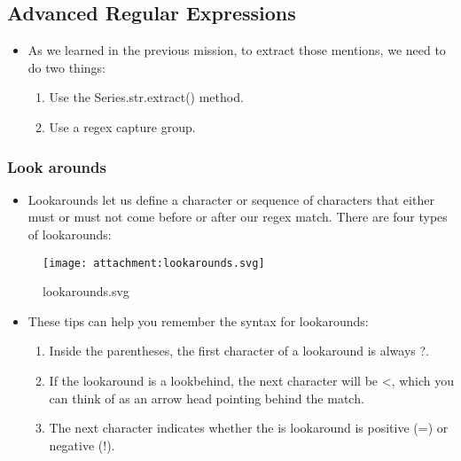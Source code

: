 \documentclass[11pt]{article}
\providecommand{\tightlist}{%
      \setlength{\itemsep}{0pt}\setlength{\parskip}{0pt}}
\begin{document}
    \hypertarget{advanced-regular-expressions}{%
\subsection{Advanced Regular
Expressions}\label{advanced-regular-expressions}}

    \begin{itemize}
\item
  As we learned in the previous mission, to extract those mentions, we
  need to do two things:

  \begin{enumerate}
  \def\labelenumi{\arabic{enumi}.}
  \tightlist
  \item
    Use the Series.str.extract() method.
  \item
    Use a regex capture group.
  \end{enumerate}
\end{itemize}

\hypertarget{look-arounds}{%
\subsubsection{Look arounds}\label{look-arounds}}

\begin{itemize}
\tightlist
\item
  Lookarounds let us define a character or sequence of characters that
  either must or must not come before or after our regex match. There
  are four types of lookarounds:
\end{itemize}

\begin{figure}
\centering
\texttt{[image: attachment:lookarounds.svg]}
\caption{lookarounds.svg}
\end{figure}

\begin{itemize}
\item
  These tips can help you remember the syntax for lookarounds:

  \begin{enumerate}
  \def\labelenumi{\arabic{enumi}.}
  \tightlist
  \item
    Inside the parentheses, the first character of a lookaround is
    always ?.
  \item
    If the lookaround is a lookbehind, the next character will be
    \textless{}, which you can think of as an arrow head pointing behind
    the match.
  \item
    The next character indicates whether the is lookaround is positive
    (=) or negative (!).
  \end{enumerate}
\end{itemize}
\end{document}
